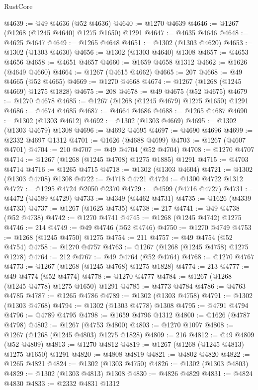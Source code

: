 \begin{lexlean}{RustCore}
\begin{coremodule}
@4639 := @49 @4636 (@52 @4636)
@4640 := @1270 @4639
@4646 := @1267 (@1268 (@1245 @4640) @1275 @1650) @1291
@4647 := @4635 @4646
@4648 := @4625 @4647
@4649 := @1265 @4648
@4651 := @1302 (@1303 @4620)
@4653 := @1302 (@1303 @4630)
@4656 := @1302 (@1303 @4640) @1308
@4657 := @4653 @4656
@4658 := @4651 @4657
@4660 := @1659 @4658 @1312
@4662 := @1626 (@4649 @4660)
@4664 := @1267 (@4615 @4662)
@4665 := 207
@4668 := @49 @4665 (@52 @4665)
@4669 := @1270 @4668
@4674 := @1267 (@1268 (@1245 @4669) @1275 @1828)
@4675 := 208
@4678 := @49 @4675 (@52 @4675)
@4679 := @1270 @4678
@4685 := @1267 (@1268 (@1245 @4679) @1275 @1650) @1291
@4686 := @4674 @4685
@4687 := @4664 @4686
@4688 := @1265 @4687
@4690 := @1302 (@1303 @4612)
@4692 := @1302 (@1303 @4669)
@4695 := @1302 (@1303 @4679) @1308
@4696 := @4692 @4695
@4697 := @4690 @4696
@4699 := @2332 @4697 @1312
@4701 := @1626 (@4688 @4699)
@4703 := @1267 (@4607 @4701)
@4704 := 210
@4707 := @49 @4704 (@52 @4704)
@4708 := @1270 @4707
@4714 := @1267 (@1268 (@1245 @4708) @1275 @1885) @1291
@4715 := @4703 @4714
@4716 := @1265 @4715
@4718 := @1302 (@1303 @4604)
@4721 := @1302 (@1303 @4708) @1308
@4722 := @4718 @4721
@4724 := @1300 @4722 @1312
@4727 := @1295 @4724 @2050 @2370
@4729 := @4599 (@4716 @4727)
@4731 := @4472 (@4589 @4729)
@4733 := @4349 (@4462 @4731)
@4735 := @1626 (@4339 @4733)
@4737 := @1267 (@1625 @4735)
@4738 := 217
@4741 := @49 @4738 (@52 @4738)
@4742 := @1270 @4741
@4745 := @1268 (@1245 @4742) @1275
@4746 := 214
@4749 := @49 @4746 (@52 @4746)
@4750 := @1270 @4749
@4753 := @1268 (@1245 @4750) @1275
@4754 := 211
@4757 := @49 @4754 (@52 @4754)
@4758 := @1270 @4757
@4763 := @1267 (@1268 (@1245 @4758) @1275 @1278)
@4764 := 212
@4767 := @49 @4764 (@52 @4764)
@4768 := @1270 @4767
@4773 := @1267 (@1268 (@1245 @4768) @1275 @1828)
@4774 := 213
@4777 := @49 @4774 (@52 @4774)
@4778 := @1270 @4777
@4784 := @1267 (@1268 (@1245 @4778) @1275 @1650) @1291
@4785 := @4773 @4784
@4786 := @4763 @4785
@4787 := @1265 @4786
@4789 := @1302 (@1303 @4758)
@4791 := @1302 (@1303 @4768)
@4794 := @1302 (@1303 @4778) @1308
@4795 := @4791 @4794
@4796 := @4789 @4795
@4798 := @1659 @4796 @1312
@4800 := @1626 (@4787 @4798)
@4802 := @1267 (@4753 @4800)
@4803 := @1270 @1097
@4808 := @1267 (@1268 (@1245 @4803) @1275 @1828)
@4809 := 216
@4812 := @49 @4809 (@52 @4809)
@4813 := @1270 @4812
@4819 := @1267 (@1268 (@1245 @4813) @1275 @1650) @1291
@4820 := @4808 @4819
@4821 := @4802 @4820
@4822 := @1265 @4821
@4824 := @1302 (@1303 @4750)
@4826 := @1302 (@1303 @4803)
@4829 := @1302 (@1303 @4813) @1308
@4830 := @4826 @4829
@4831 := @4824 @4830
@4833 := @2332 @4831 @1312

\end{coremodule}
\end{lexlean}
